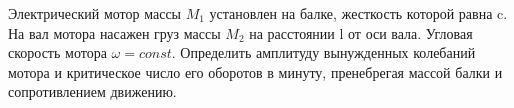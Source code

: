 Электрический мотор массы $M_{1}$ установлен на балке, жесткость которой равна c. На вал мотора насажен груз массы $M_{2}$ на расстоянии l от оси вала. Угловая скорость мотора 
$\omega=const$. Определить амплитуду вынужденных колебаний мотора и критическое число его оборотов в минуту, пренебрегая массой балки и сопротивлением движению.